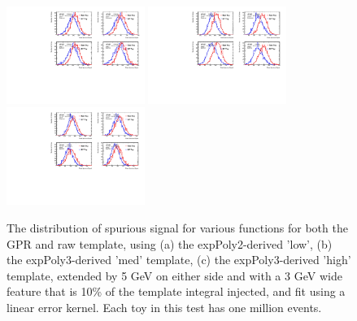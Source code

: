 \begin{figure} 
\begin{center}
  \includegraphics[width=0.4\textwidth]{figures/background/gpr/validation/linear/ToyTest_FitSigVals_lowpT_10k_Siginj}   
  \includegraphics[width=0.4\textwidth]{figures/background/gpr/validation/linear/ToyTest_FitSigVals_medpT_10k_Siginj}   
  \includegraphics[width=0.4\textwidth]{figures/background/gpr/validation/linear/ToyTest_FitSigVals_highpT_10k_Siginj}   
\caption{The distribution of spurious signal for various functions for both the GPR and raw template, using (a) the expPoly2-derived 'low', (b) the expPoly3-derived 'med' template, (c) the expPoly3-derived 'high' template, extended by 5 GeV on either side and with a 3 GeV wide feature that is 10\% of the template integral injected, and fit using a linear error kernel. Each toy in this test has one million events.}
\label{fig:linearkernel_lowpt_10k_Siginj}
\end{center}
\end{figure}

